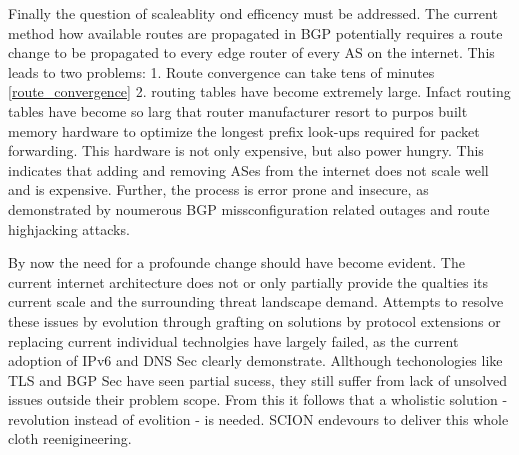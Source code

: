 \documentclass[../eva1_scion.tex]{subfiles}
\begin{document}
Finally the question of scaleablity ond efficency must be addressed. The current method how available routes are propagated in BGP potentially requires a route change to be propagated to every edge router of every AS on the internet. This leads to two problems: 1. Route convergence can take tens of minutes \ref{route_convergence} 2. routing tables have become extremely large. Infact routing tables have become so larg that router manufacturer resort to purpos built memory hardware to optimize the longest prefix look-ups required for packet forwarding. This hardware is not only expensive, but also power hungry. This indicates that adding and removing ASes from the internet does not scale well and is expensive. Further, the process is error prone and insecure, as demonstrated by noumerous BGP missconfiguration related outages and route highjacking attacks.

By now the need for a profounde change should have become evident. The current internet architecture does not or only partially provide the qualties its current scale and the surrounding threat landscape demand. Attempts to resolve these issues by evolution through grafting on solutions by protocol extensions or replacing current individual technolgies have largely failed, as the current adoption of IPv6 and DNS Sec clearly demonstrate. Allthough techonologies like TLS and BGP Sec have seen partial sucess, they still suffer from lack of unsolved issues outside their problem scope. From this it follows that a wholistic solution - revolution instead of evolition - is needed. SCION endevours to deliver this whole cloth reenigineering. 
\end{document}
